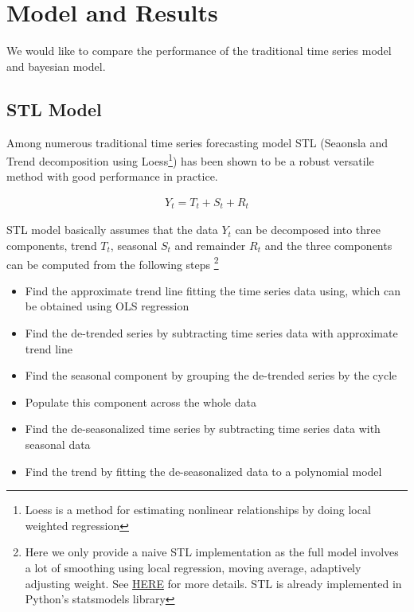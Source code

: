 \documentclass[letterpaper,12pt]{article}
\begin{document}
\section{Model and Results}
We would like to compare the performance of the traditional time series model and bayesian model. 

\subsection{STL Model}
Among numerous traditional time series forecasting model STL (Seaonsla and Trend decomposition using Loess\footnote{Loess is a method for estimating nonlinear relationships by doing local weighted regression}) \citep{cleveland1990stl} has been shown to be a robust versatile method with good performance in practice. 

\begin{align*}
	Y_t=T_t+S_t+R_t
\end{align*}

STL model basically assumes that the data $Y_t$ can be decomposed into three components, trend $T_t$, seasonal $S_t$ and remainder $R_t$ and the three components can be computed from the following steps \footnote{Here we only provide a naive STL implementation as the full model involves a lot of smoothing using local regression, moving average, adaptively adjusting weight. See \href{https://towardsdatascience.com/stl-decomposition-how-to-do-it-from-scratch-b686711986ec}{HERE} for more details. STL is already implemented in Python's statsmodels library}

\begin{itemize}
\item Find the approximate trend line fitting the time series data using, which can be obtained using OLS regression
\item Find the de-trended series by subtracting time series data with approximate trend line
\item Find the seasonal component by grouping the de-trended series by the cycle
\item Populate this component across the whole data
\item Find the de-seasonalized time series by subtracting time series data with seasonal data
\item Find the trend by fitting the de-seasonalized data to a polynomial model
\end{itemize}
\end{document}
